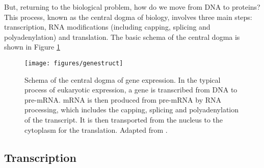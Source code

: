 
But, returning to the biological problem, how do we move from DNA to
proteins? This process, known as the central dogma of biology,
involves three main steps: transcription, RNA modifications (including
capping, splicing and polyadenylation) and translation. The basic
schema of the central dogma is shown in Figure \ref{central dogma}

\begin{figure}
\begin{center}
\texttt{[image: figures/genestruct]}
\caption[Schema of the central dogma of gene expression]{Schema of the
central dogma of gene expression. In the typical process of eukaryotic
expression, a gene is transcribed from DNA to pre-mRNA. mRNA is then
produced from pre-mRNA by RNA processing, which includes the capping,
splicing and polyadenylation of the transcript. It is then transported
from the nucleus to the cytoplasm for the translation. Adapted from
\cite{zhang:2002a}.} \label{central dogma}
\end{center}
\end{figure}

\subsection*{Transcription}

